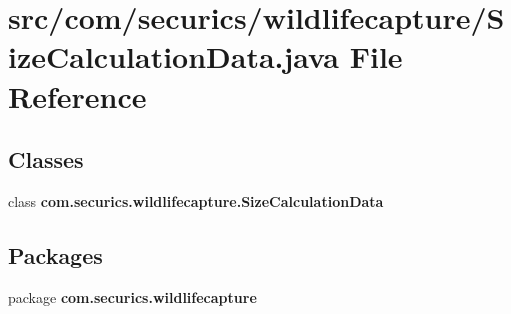 \section{src/com/securics/wildlifecapture/\+Size\+Calculation\+Data.java File Reference}
\label{_size_calculation_data_8java}
\subsection*{Classes}
\begin{DoxyCompactItemize}
\item 
class {\bf com.\+securics.\+wildlifecapture.\+Size\+Calculation\+Data}
\end{DoxyCompactItemize}
\subsection*{Packages}
\begin{DoxyCompactItemize}
\item 
package {\bf com.\+securics.\+wildlifecapture}
\end{DoxyCompactItemize}
